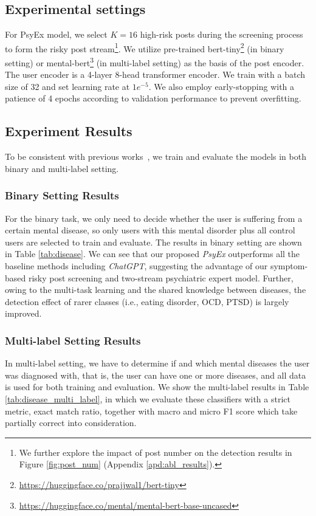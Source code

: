 \subsection{Experimental settings}
\label{sec:exp_set}
For PsyEx model, we select $K=16$ high-risk posts during the screening process to form the risky post stream\footnote{We further explore the impact of post number on the detection results in Figure \ref{fig:post_num} (Appendix \ref{apd:abl_results}).}.
We utilize pre-trained bert-tiny\footnote{\url{https://huggingface.co/prajjwal1/bert-tiny}} (in binary setting) or mental-bert\footnote{\url{https://huggingface.co/mental/mental-bert-base-uncased}} (in multi-label setting) as the basis of the post encoder.  The user encoder is a 4-layer 8-head transformer encoder. We train with a batch size of 32 and set learning rate at $1e^{-5}$. We also employ early-stopping with a patience of 4 epochs according to validation performance to prevent overfitting.

\subsection{Experiment Results}

To be consistent with previous works~\cite{cohan2018smhd}, we train and evaluate the models in both binary and multi-label setting. 

\subsubsection{Binary Setting Results}
For the binary task, we only need to decide whether the user is suffering from a certain mental disease, so only users with this mental disorder plus all control users are selected to train and evaluate. The results in binary setting are shown in Table \ref{tab:disease}. We can see that our proposed \textit{PsyEx} outperforms all the baseline methods including \textit{ChatGPT}, suggesting the advantage of our symptom-based risky post screening and two-stream psychiatric expert model. Further, owing to the multi-task learning and the shared knowledge between diseases, the detection effect of rarer classes (i.e., eating disorder, OCD, PTSD) is largely improved. 

\subsubsection{Multi-label Setting Results}
In multi-label setting, we have to determine if and which mental diseases the user was diagnosed with, that is, the user can have one or more diseases, and all data is used for both training and evaluation. %
We show the multi-label results in Table \ref{tab:disease_multi_label}, in which we evaluate these classifiers with a strict metric, exact match ratio, together with macro and micro F1 score which take partially correct into consideration. 

